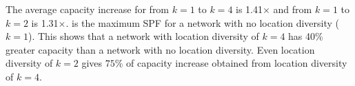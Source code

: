 The average capacity increase for \opt{} from $k = 1$ to $k = 4$ is 1.41$\times$ and from $k = 1$ to $k = 2$ is 1.31$\times$. \opt{} is the maximum SPF for a network with no location diversity ($k = 1$). This shows that a network with location diversity of $k = 4$ has 40\% greater capacity than a network with no location diversity. Even location diversity of $k = 2$ gives $75\%$ of capacity increase obtained from location diversity of $k = 4$. 

%
%
%


